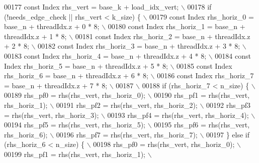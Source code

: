 \begin{DoxyCode}
00177 \textcolor{preprocessor}{    const Index rhs\_vert = base\_k + load\_idx\_vert;              \(\backslash\)}
00178 \textcolor{preprocessor}{    if (!needs\_edge\_check || rhs\_vert < k\_size) \{               \(\backslash\)}
00179 \textcolor{preprocessor}{      const Index rhs\_horiz\_0 = base\_n + threadIdx.z + 0 * 8;   \(\backslash\)}
00180 \textcolor{preprocessor}{      const Index rhs\_horiz\_1 = base\_n + threadIdx.z + 1 * 8;   \(\backslash\)}
00181 \textcolor{preprocessor}{      const Index rhs\_horiz\_2 = base\_n + threadIdx.z + 2 * 8;   \(\backslash\)}
00182 \textcolor{preprocessor}{      const Index rhs\_horiz\_3 = base\_n + threadIdx.z + 3 * 8;   \(\backslash\)}
00183 \textcolor{preprocessor}{      const Index rhs\_horiz\_4 = base\_n + threadIdx.z + 4 * 8;   \(\backslash\)}
00184 \textcolor{preprocessor}{      const Index rhs\_horiz\_5 = base\_n + threadIdx.z + 5 * 8;   \(\backslash\)}
00185 \textcolor{preprocessor}{      const Index rhs\_horiz\_6 = base\_n + threadIdx.z + 6 * 8;   \(\backslash\)}
00186 \textcolor{preprocessor}{      const Index rhs\_horiz\_7 = base\_n + threadIdx.z + 7 * 8;   \(\backslash\)}
00187 \textcolor{preprocessor}{                                                                \(\backslash\)}
00188 \textcolor{preprocessor}{      if (rhs\_horiz\_7 < n\_size) \{                               \(\backslash\)}
00189 \textcolor{preprocessor}{        rhs\_pf0 = rhs(rhs\_vert, rhs\_horiz\_0);                   \(\backslash\)}
00190 \textcolor{preprocessor}{        rhs\_pf1 = rhs(rhs\_vert, rhs\_horiz\_1);                   \(\backslash\)}
00191 \textcolor{preprocessor}{        rhs\_pf2 = rhs(rhs\_vert, rhs\_horiz\_2);                   \(\backslash\)}
00192 \textcolor{preprocessor}{        rhs\_pf3 = rhs(rhs\_vert, rhs\_horiz\_3);                   \(\backslash\)}
00193 \textcolor{preprocessor}{        rhs\_pf4 = rhs(rhs\_vert, rhs\_horiz\_4);                   \(\backslash\)}
00194 \textcolor{preprocessor}{        rhs\_pf5 = rhs(rhs\_vert, rhs\_horiz\_5);                   \(\backslash\)}
00195 \textcolor{preprocessor}{        rhs\_pf6 = rhs(rhs\_vert, rhs\_horiz\_6);                   \(\backslash\)}
00196 \textcolor{preprocessor}{        rhs\_pf7 = rhs(rhs\_vert, rhs\_horiz\_7);                   \(\backslash\)}
00197 \textcolor{preprocessor}{      \} else if (rhs\_horiz\_6 < n\_size) \{                        \(\backslash\)}
00198 \textcolor{preprocessor}{        rhs\_pf0 = rhs(rhs\_vert, rhs\_horiz\_0);                   \(\backslash\)}
00199 \textcolor{preprocessor}{        rhs\_pf1 = rhs(rhs\_vert, rhs\_horiz\_1);                   \(\backslash\)}

\end{DoxyCode}
